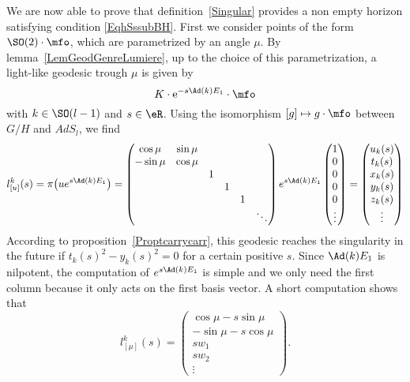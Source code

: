 We are now able to prove that definition~\ref{Singular} provides a non empty horizon satisfying condition \eqref{EqhSssubBH}.  First we  consider points of the form $\SO(2)\cdot\mfo$, which are parametrized by an angle $\mu$. By lemma~\ref{LemGeodGenreLumiere}, up to the choice of this parametrization, a light-like geodesic trough $\mu$ is given by
\begin{equation}
	K\cdot \mbox{e}^{-s\Ad(k)E_1}\cdot\mfo
\end{equation}
with $k\in \SO(l-1)$ and  $s\in\eR$. Using the isomorphism $[g]\mapsto g\cdot \mfo$ between $G/H$ and $AdS_l$, we find
\begin{equation}		\label{EqhohnCondHOrExpl}
	l^k_{[u]}(s)= \pi\big( u e^{s\Ad(k)E_1} \big)=
	\begin{pmatrix}
		\cos\mu  & \sin\mu                      \\
		-\sin\mu & \cos\mu                      \\
		         &         & 1                  \\
		         &         &   & 1              \\
		         &         &   &   & 1          \\
		         &         &   &   &   & \ddots
	\end{pmatrix}
	e^{s\Ad(k)E_1}
	\begin{pmatrix}
		1 \\0\\0\\0\\0\\\vdots
	\end{pmatrix}
	=
	\begin{pmatrix}
		u_{k}(s) \\t_{k}(s)\\x_{k}(s)\\y_{k}(s)\\z_{k}(s)\\\vdots
	\end{pmatrix}
\end{equation}
According to proposition~\ref{Proptcarrycarr}, this geodesic reaches the singularity in the future if $t_{k}(s)^{2}-y_{k}(s)^{2}=0$ for a certain positive $s$. Since $\Ad(k)E_1$ is nilpotent, the computation of $ e^{s\Ad(k)E_1}$ is simple and we only need the first column because it only acts on the first basis vector. A short computation shows that
\begin{equation}  \label{EqGedCompo}
	l_{[\mu]}^{k}(s)=
	\begin{pmatrix}
		\cos\mu-s\sin\mu  \\
		-\sin\mu-s\cos\mu \\
		sw_{1}            \\
		sw_{2}            \\
		\vdots
	\end{pmatrix}.
\end{equation}

